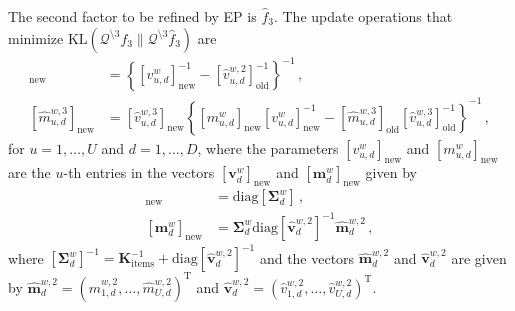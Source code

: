 \documentclass{article}
\begin{document}
The second factor to be refined by EP is $\hat{f}_3$. The update operations that minimize
$\text{KL}(\mathcal{Q}^{\setminus 3} f_3 \| \mathcal{Q}^{\setminus 3} \hat{f}_3)$ are
\begin{align}
[\hat{v}_{u,d}^{w,3}]_\text{new} & =
\left\{ [v_{u,d}^{w}]_\text{new}^{-1} - [\hat{v}_{u,d}^{w,2} ]_\text{old}^{-1}\right\}^{-1}\,,\\
[\hat{m}_{u,d}^{w,3}]_\text{new} & =
[\hat{v}_{u,d}^{w,3}]_\text{new} \left\{[ m_{u,d}^{w}]_\text{new} 
[v_{u,d}^{w}]_\text{new}^{-1} - [\hat{m}_{u,d}^{w,3}]_\text{old} [\hat{v}_{u,d}^{w,3}]_\text{old}^{-1}\right\}^{-1}\,,
\end{align}
for $u = 1,\ldots,U$ and $d = 1,\ldots,D$,
where the parameters $[v_{u,d}^{w}]_\text{new}$ and $[ m_{u,d}^{w}]_\text{new}$ are the $u$-th entries in the vectors
$[\mathbf{v}_{d}^{w}]_\text{new}$ and $[\mathbf{m}_{d}^{w}]_\text{new}$ given by
\begin{align}
[\mathbf{v}_{d}^{w}]_\text{new} & = \text{diag}\left[ \bm \Sigma_d^w \right]\,,\label{eq:Sigmaw} \\
[\mathbf{m}_{d}^{w}]_\text{new} & = \bm \Sigma_d^w \text{diag}[\hat{\mathbf{v}}_d^{w,2}]^{-1} \hat{\mathbf{m}}_d^{w,2}\label{eq:Sigma2w}\,,
\end{align}
where $[ \bm \Sigma_d^w]^{-1} = \mathbf{K}^{-1}_\text{items} + \text{diag}[\hat{\mathbf{v}}_d^{w,2}]^{-1}$ and
the vectors $\hat{\mathbf{m}}_d^{w,2}$ and $\hat{\mathbf{v}}_d^{w,2}$ are given by
$\hat{\mathbf{m}}_d^{w,2}=(\hat{m}_{1,d}^{w,2},\ldots,\hat{m}_{U,d}^{w,2})^\text{T}$ and
$\hat{\mathbf{v}}_d^{w,2}=(\hat{v}_{1,d}^{w,2},\ldots,\hat{v}_{U,d}^{w,2})^\text{T}$.
\end{document}
